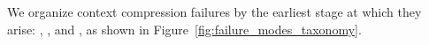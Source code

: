 We organize context compression failures by the earliest stage at which they arise: {\fone}, {\ftwo}, and {\fthree}, as shown in Figure~\ref{fig:failure_modes_taxonomy}.








